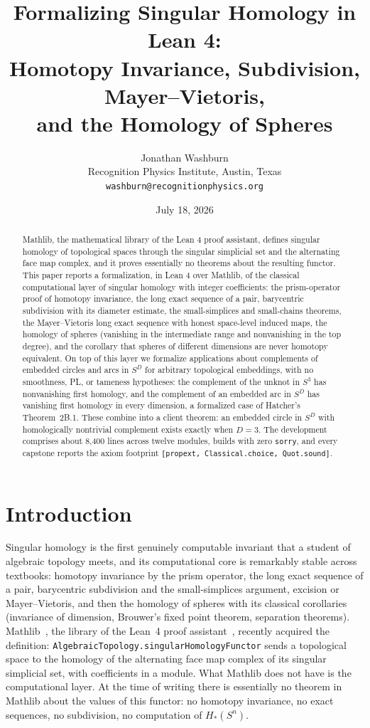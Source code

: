\documentclass[11pt]{article}
\title{Formalizing Singular Homology in Lean 4:\\
Homotopy Invariance, Subdivision, Mayer--Vietoris,\\
and the Homology of Spheres}
\author{Jonathan Washburn\\
\small Recognition Physics Institute, Austin, Texas\\
\small \texttt{washburn@recognitionphysics.org}}
\date{July 18, 2026}
\theoremstyle{remark}
\newcommand{\leanname}[1]{\texttt{#1}}
\begin{document}
\sloppy

\maketitle

\begin{abstract}
Mathlib, the mathematical library of the Lean 4 proof assistant, defines
singular homology of topological spaces through the singular simplicial set
and the alternating face map complex, and it proves essentially no theorems
about the resulting functor. This paper reports a formalization, in Lean 4
over Mathlib, of the classical computational layer of singular homology with
integer coefficients: the prism-operator proof of homotopy invariance, the
long exact sequence of a pair, barycentric subdivision with its diameter
estimate, the small-simplices and small-chains theorems, the Mayer--Vietoris
long exact sequence with honest space-level induced maps, the homology of
spheres (vanishing in the intermediate range and nonvanishing in the top
degree), and the corollary that spheres of different dimensions are never
homotopy equivalent. On top of this layer we formalize applications about
complements of embedded circles and arcs in $S^D$ for arbitrary topological
embeddings, with no smoothness, PL, or tameness hypotheses: the complement of
the unknot in $S^3$ has nonvanishing first homology, and the complement of an
embedded arc in $S^D$ has vanishing first homology in every dimension, a
formalized case of Hatcher's Theorem~2B.1. These combine into a client
theorem: an embedded circle in $S^D$ with homologically nontrivial complement
exists exactly when $D = 3$. The development comprises about 8{,}400 lines
across twelve modules, builds with zero \texttt{sorry}, and every capstone
reports the axiom footprint \texttt{[propext, Classical.choice, Quot.sound]}.
\end{abstract}

\section{Introduction}\label{sec:intro}

Singular homology is the first genuinely computable invariant that a student
of algebraic topology meets, and its computational core is remarkably
stable across textbooks: homotopy invariance by the prism operator, the long
exact sequence of a pair, barycentric subdivision and the small-simplices
argument, excision or Mayer--Vietoris, and then the homology of spheres with
its classical corollaries (invariance of dimension, Brouwer's fixed point
theorem, separation theorems). Mathlib~\cite{mathlib}, the library of the
Lean~4 proof assistant~\cite{lean4}, recently acquired the definition:
\leanname{AlgebraicTopology.singularHomologyFunctor} sends a topological
space to the homology of the alternating face map complex of its singular
simplicial set, with coefficients in a module. What Mathlib does not have is
the computational layer. At the time of writing there is essentially no
theorem in Mathlib about the values of this functor: no homotopy invariance,
no exact sequences, no subdivision, no computation of $H_*(S^n)$.
\end{document}
